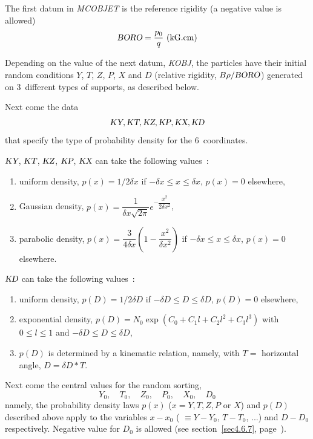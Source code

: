  \bigskip

\noindent The first datum in \textsl{MCOBJET}  is the reference rigidity (a negative value is 
allowed)   
$$ \textsl{BORO} = \dfrac{p_0 }{ q} \text{ (kG.cm)} $$

\noindent Depending on the value of the next datum, \textsl{KOBJ}, the 
\IMAX{} particles have their initial random 
conditions $ Y$, $T$, $Z$, $P$, $X$ and $ D $ (relative rigidity, $B\rho/\textsl{BORO}$)  generated 
on 3~different types of supports, as described below. 

\noindent Next come the data
$$\textsl{KY}, \textsl{KT}, \textsl{KZ}, \textsl{KP}, \textsl{KX}, \textsl{KD}$$  %
that specify the type of probability density for the 6~coordinates. 

\noindent $\textsl{KY}$, $\textsl{KT}$, $\textsl{KZ}$, $\textsl{KP}$, $\textsl{KX}$ can take the following values~:
\begin{enumerate}
\item uniform density, $p(x) =1/2\delta x$ if  $-\delta x \leq x \leq \delta x$, $p(x) = 0$ elsewhere,
\item Gaussian density, $p(x) = \dfrac{1}{\delta x \sqrt{2\pi}} 
	e^{- \dfrac{x^2}{2 \delta x^2}}$,
\item parabolic density, $p(x) = \dfrac{3}{4 \delta x} 
	(1- \dfrac{x^2}{\delta x^2})$ if $-\delta x \leq x \leq \delta x$, $p(x) = 0$ elsewhere.
\end{enumerate}

\noindent $\textsl{KD}$ can take the following values~:
\begin{enumerate}
\item uniform density, $p(D) =1/2\delta \! D$ if  $-\delta \! D \leq D \leq \delta \! D$, $p(D) = 0$ elsewhere,
\item exponential density, $p(D) = N_0 \exp (C_0 + C_1 l + C_2 l^2 + C_3 l^3)$
	with $0 \leq l \leq 1$ and $-\delta D \leq D \leq \delta D$,
\item $p(D)$ is determined by a kinematic relation, namely, with $T=$ 
horizontal angle, $D= \delta D \ast T$.
\end{enumerate}

\noindent Next come the central values for the random sorting, 
$$    Y_0,\quad    T_0,\quad    Z_0,\quad P_0,\quad  X_0, \quad D_0 $$
%
namely, the probability density laws $p(x)$ ($x= Y, T, Z, P$ or $X$) 
and $p(D)$ described above apply to the variables $x-x_0$
( $\equiv Y- Y_0$, $T-T_0$, ...) and $D- D_0$ respectively. Negative 
value for $D_0$ is allowed (see section~\ref{sec4.6.7}, page~\pageref{sec4.6.7}).
 \bigskip


